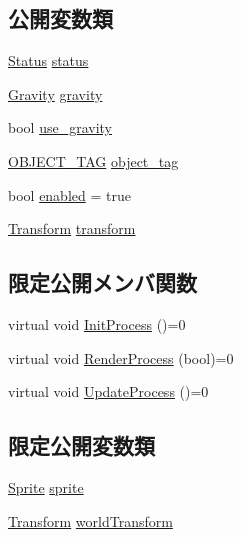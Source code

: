 \subsection*{公開変数類}
\begin{DoxyCompactItemize}
\item 
\mbox{\hyperlink{class_status}{Status}} \mbox{\hyperlink{class_object_base_a03b285263802692be1f3a9a7b13e5344}{status}}
\item 
\mbox{\hyperlink{class_gravity}{Gravity}} \mbox{\hyperlink{class_object_base_a570bfa03730e906989187bfbcad95c51}{gravity}}
\item 
bool \mbox{\hyperlink{class_object_base_aab135a2a04e76046804f01b63df4f35c}{use\+\_\+gravity}}
\item 
\mbox{\hyperlink{object__base_8h_a0eff9883ab049ee02773dde19d057c0c}{O\+B\+J\+E\+C\+T\+\_\+\+T\+AG}} \mbox{\hyperlink{class_object_base_aff7eb5482ca9bc1cd30b84994d0dad8b}{object\+\_\+tag}}
\item 
bool \mbox{\hyperlink{class_object_base_ade1c868f20653a6fa5236544120eca2b}{enabled}} = true
\item 
\mbox{\hyperlink{class_transform}{Transform}} \mbox{\hyperlink{class_object_base_ac8096c26fe09682da6119208d392dc62}{transform}}
\end{DoxyCompactItemize}
\subsection*{限定公開メンバ関数}
\begin{DoxyCompactItemize}
\item 
virtual void \mbox{\hyperlink{class_object_base_af133f36f2bca1dcfd962e2cfac61ab51}{Init\+Process}} ()=0
\item 
virtual void \mbox{\hyperlink{class_object_base_aeac51d868beeb7f7fe900407b76b93a2}{Render\+Process}} (bool)=0
\item 
virtual void \mbox{\hyperlink{class_object_base_a8b5b72b363a419767efde0b0e692ea95}{Update\+Process}} ()=0
\end{DoxyCompactItemize}
\subsection*{限定公開変数類}
\begin{DoxyCompactItemize}
\item 
\mbox{\hyperlink{class_sprite}{Sprite}} \mbox{\hyperlink{class_object_base_a16415e349623e10f45518fb637f7051b}{sprite}}
\item 
\mbox{\hyperlink{class_transform}{Transform}} \mbox{\hyperlink{class_object_base_abedc2ea4baa694611f8822ea6e04b210}{world\+Transform}}
\end{DoxyCompactItemize}


